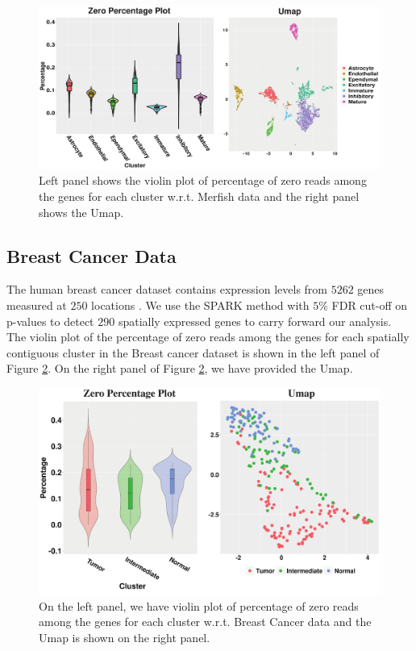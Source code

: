 \documentclass[
]{book}
\begin{document}
\begin{figure}

{\centering \includegraphics[width=0.9\linewidth]{images/Merfish_zero_umap} 

}

\caption{Left panel shows the violin plot of percentage of zero reads among the genes for each cluster w.r.t. Merfish data and the right panel shows the Umap.}\label{fig:zeroperMF}
\end{figure}

\hypertarget{breast-cancer-data}{%
\subsection{Breast Cancer Data}\label{breast-cancer-data}}

The human breast cancer dataset contains expression levels from \(5262\) genes measured at \(250\) locations \citep{staahl2016visualization}. We use the SPARK method with \(5\%\) FDR cut-off on p-values to detect \(290\) spatially expressed genes to carry forward our analysis. The violin plot of the percentage of zero reads among the genes for each spatially contiguous cluster in the Breast cancer dataset is shown in the left panel of Figure \ref{fig:BCperzero}. On the right panel of Figure \ref{fig:BCperzero}, we have provided the Umap.

\begin{figure}

{\centering \includegraphics[width=0.8\linewidth]{images/BC_zero_umap} 

}

\caption{On the left panel, we have violin plot of percentage of zero reads among the genes for each cluster w.r.t. Breast Cancer data and the Umap is shown on the right panel.}\label{fig:BCperzero}
\end{figure}
\end{document}
